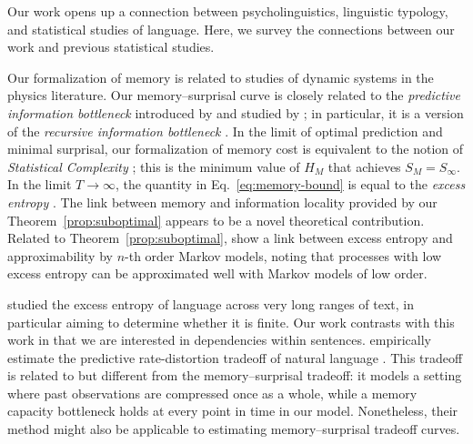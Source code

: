 Our work opens up a connection between psycholinguistics, linguistic typology, and statistical studies of language. Here, we survey the connections between our work and previous statistical studies.



Our formalization of memory is related to studies of dynamic systems in the physics literature.
Our memory--surprisal curve is closely related to the \emph{predictive information bottleneck} introduced by \citet{still-information-2014} and studied by \citet{marzen-predictive-2016}; in particular, it is a version of the \emph{recursive information bottleneck} \citep[][\S 4]{still-information-2014}. 
In the limit of optimal prediction and minimal surprisal, our formalization of memory cost is equivalent to the notion of \emph{Statistical Complexity} \citep{crutchfield-inferring-1989,shalizi2001computational}; this is the minimum value of $H_M$ that achieves $S_M = S_\infty$.
In the limit $T \rightarrow \infty$, the quantity in Eq.~\ref{eq:memory-bound} is equal to the \emph{excess entropy} \citep{crutchfield-inferring-1989}.
The link between memory and information locality provided by our Theorem~\ref{prop:suboptimal} appears to be a novel theoretical contribution.
Related to Theorem~\ref{prop:suboptimal}, \citet{sharan-prediction-2016} show a link between excess entropy and approximability by $n$-th order Markov models, noting that processes with low excess entropy can be approximated well with Markov models of low order.

\cite{debowski-excess-2011} studied the excess entropy of language across very long ranges of text, in particular aiming to determine whether it is finite.
Our work contrasts with this work in that we are interested in dependencies within sentences.
\cite{hahn2019estimating} empirically estimate the predictive rate-distortion tradeoff of natural language \citep{still-information-2014,marzen-predictive-2016}.
This tradeoff is related to but different from the memory--surprisal tradeoff: it models a setting where past observations are compressed once as a whole, while a memory capacity bottleneck holds at every point in time in our model.
Nonetheless, their method might also be applicable to estimating memory--surprisal tradeoff curves.


